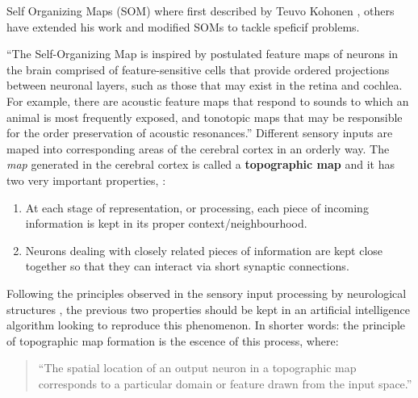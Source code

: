 \documentclass[]{book}
\providecommand{\tightlist}{%
  \setlength{\itemsep}{0pt}\setlength{\parskip}{0pt}}
\begin{document}
Self Organizing Maps (SOM) where first described by Teuvo Kohonen
\citep{kohonen1995self}, others have extended his work and modified SOMs
to tackle speficif problems.

``The Self-Organizing Map is inspired by postulated feature maps of
neurons in the brain comprised of feature-sensitive cells that provide
ordered projections between neuronal layers, such as those that may
exist in the retina and cochlea. For example, there are acoustic feature
maps that respond to sounds to which an animal is most frequently
exposed, and tonotopic maps that may be responsible for the order
preservation of acoustic resonances.'' \citep{brownlee2011clever}
Different sensory inputs are maped into corresponding areas of the
cerebral cortex in an orderly way. The \emph{map} generated in the
cerebral cortex is called a \textbf{topographic map} and it has two very
important properties, \citep{somFundamentals}:

\begin{enumerate}
\def\labelenumi{\arabic{enumi}.}
\tightlist
\item
  At each stage of representation, or processing, each piece of incoming
  information is kept in its proper context/neighbourhood.
\item
  Neurons dealing with closely related pieces of information are kept
  close together so that they can interact via short synaptic
  connections.
\end{enumerate}

Following the principles observed in the sensory input processing by
neurological structures , the previous two properties should be kept in
an artificial intelligence algorithm looking to reproduce this
phenomenon. In shorter words: the principle of topographic map formation
is the escence of this process, where:

\begin{quote}
``The spatial location of an output neuron in a topographic map
corresponds to a particular domain or feature drawn from the input
space.'' \citep{somFundamentals}
\end{quote}


\end{document}
